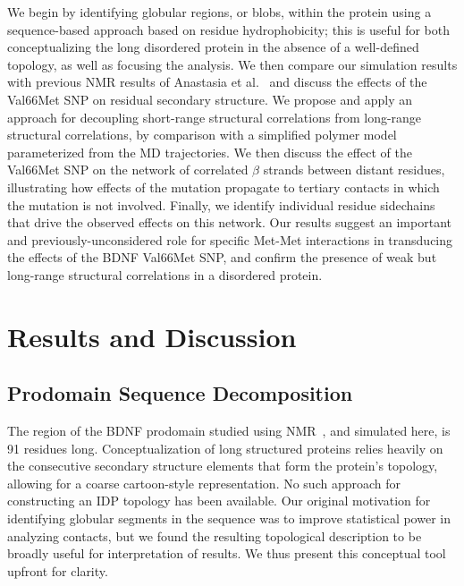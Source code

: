 \documentclass[10pt,letterpaper]{article}
\begin{document}
We begin by identifying globular regions, or blobs, within the protein using a sequence-based approach based on residue hydrophobicity; this is useful for both conceptualizing the long disordered protein in the absence of a well-defined topology, as well as focusing the analysis. We then compare our simulation results with previous NMR results of Anastasia et al.~\cite{Anastasia2013} and discuss the effects of the Val66Met SNP on residual secondary structure. We propose and apply an approach for decoupling short-range structural correlations from long-range structural correlations, by comparison with a simplified polymer model parameterized from the MD trajectories. We then discuss the effect of the Val66Met SNP on the network of correlated $\beta$ strands between distant residues, illustrating how effects of the mutation propagate to tertiary contacts in which the mutation is not involved. Finally, we identify individual residue sidechains that drive the observed effects on this network. Our results suggest an important and previously-unconsidered role for specific Met-Met interactions in transducing the effects of the BDNF Val66Met SNP, and confirm the presence of weak but long-range structural correlations in a disordered protein.


\section*{Results and Discussion}
\subsection*{Prodomain Sequence Decomposition} 

The region of the BDNF prodomain studied using NMR~\cite{Anastasia2013}, and simulated here, is 91 residues long. Conceptualization of long structured proteins relies heavily on the consecutive secondary structure elements that form the protein's topology, allowing for a coarse cartoon-style representation. No such approach for constructing an IDP topology has been available. Our original motivation for identifying globular segments in the sequence was to improve statistical power in analyzing contacts, but we found the resulting topological description to be broadly useful for interpretation of results. We thus present this conceptual tool upfront for clarity. 
\end{document}
